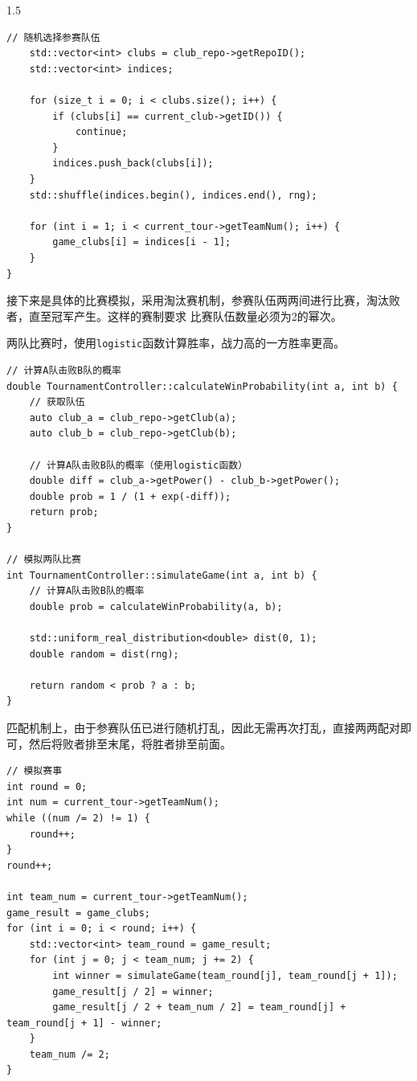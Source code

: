 \documentclass[a4paper]{article}
\begin{document}
\begin{spacing}{1.5}
\begin{lstlisting}[caption=参赛队伍设置]
    // 随机选择参赛队伍
    std::vector<int> clubs = club_repo->getRepoID();    
    std::vector<int> indices;

    for (size_t i = 0; i < clubs.size(); i++) {
        if (clubs[i] == current_club->getID()) {
            continue;
        }
        indices.push_back(clubs[i]);
    }
    std::shuffle(indices.begin(), indices.end(), rng);
    
    for (int i = 1; i < current_tour->getTeamNum(); i++) {
        game_clubs[i] = indices[i - 1];
    }   
}
    \end{lstlisting}

    接下来是具体的比赛模拟，采用淘汰赛机制，参赛队伍两两间进行比赛，淘汰败者，直至冠军产生。这样的赛制要求
    比赛队伍数量必须为2的幂次。

    两队比赛时，使用\verb|logistic|函数计算胜率，战力高的一方胜率更高。

    \begin{lstlisting}[caption=模拟两队比赛]
// 计算A队击败B队的概率
double TournamentController::calculateWinProbability(int a, int b) {
    // 获取队伍
    auto club_a = club_repo->getClub(a);
    auto club_b = club_repo->getClub(b);
    
    // 计算A队击败B队的概率（使用logistic函数）
    double diff = club_a->getPower() - club_b->getPower();
    double prob = 1 / (1 + exp(-diff));
    return prob;
}

// 模拟两队比赛
int TournamentController::simulateGame(int a, int b) {
    // 计算A队击败B队的概率
    double prob = calculateWinProbability(a, b);

    std::uniform_real_distribution<double> dist(0, 1);
    double random = dist(rng);

    return random < prob ? a : b;
}
    \end{lstlisting}
    
    
    匹配机制上，由于参赛队伍已进行随机打乱，因此无需再次打乱，直接两两配对即可，然后将败者排至末尾，将胜者排至前面。

    \begin{lstlisting}[caption=比赛模拟]
// 模拟赛事
int round = 0;
int num = current_tour->getTeamNum();
while ((num /= 2) != 1) {
    round++;
}
round++;

int team_num = current_tour->getTeamNum();
game_result = game_clubs;
for (int i = 0; i < round; i++) {
    std::vector<int> team_round = game_result;
    for (int j = 0; j < team_num; j += 2) {
        int winner = simulateGame(team_round[j], team_round[j + 1]);
        game_result[j / 2] = winner;
        game_result[j / 2 + team_num / 2] = team_round[j] + team_round[j + 1] - winner;
    }
    team_num /= 2;
}


\end{lstlisting}
\end{spacing}
\end{document}

